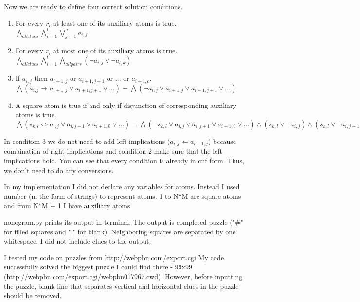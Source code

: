 \documentclass{article}
\begin{document}
Now we are ready to define four correct solution conditions.
\begin{enumerate}
    \item For every $r_i$ at least one of its auxiliary atoms is true.\\
    $\bigwedge_{all clues} \bigwedge_{i=1}^t \bigvee_{j=1}^a a_{i,j}$
    \item For every $r_i$ at most one of its auxiliary atoms is true.\\
    $\bigwedge_{all clues} \bigwedge_{i=1}^t \bigwedge_{all pairs} (\neg a_{i, j} \vee \neg a_{l, k})$
    \item If $a_{i,j}$ then $a_{i+1,j}$ or $a_{i+1,j+1}$ or ... or $a_{i+1,c}$.\\
    $\bigwedge (a_{i,j} \Rightarrow a_{i+1,j} \vee a_{i+1,j+1} \vee ...) = \bigwedge (\neg a_{i,j} \vee a_{i+1,j} \vee a_{i+1,j+1} \vee ...)$
    \item A square atom is true if and only if disjunction of corresponding auxiliary atoms is true.
    $\bigwedge (s_{k,l} \iff a_{i,j} \vee a_{i,j+1} \vee a_{i+1,0} \vee ...) = \bigwedge (\neg s_{k,l} \vee a_{i,j} \vee a_{i,j+1} \vee a_{i+1,0} \vee ...) \wedge (s_{k,l} \vee \neg a_{i,j}) \wedge (s_{k,l} \vee \neg a_{i,j+1}) \wedge ...$
\end{enumerate}

In condition 3 we do not need to add left implications ($a_{i,j} \Leftarrow a_{i+1,j}$) because combination of right implications and condition 2 make sure that the left implications hold. You can see that every condition is already in cnf form. Thus, we don't need to do any conversions.

In my implementation I did not declare any variables for atoms. Instead I used number (in the form of strings) to represent atoms. 1 to N*M are square atoms and from N*M + 1 I have auxiliary atoms.

nonogram.py prints its output in terminal. The output is completed puzzle ("\#" for filled squares and "." for blank). Neighboring squares are separated by one whitespace. I did not include clues to the output.

I tested my code on puzzles from http://webpbn.com/export.cgi My code successfully solved the biggest puzzle I could find there - 99x99\\ (http://webpbn.com/export.cgi/webpbn017967.cwd). However, before inputting the puzzle, blank line that separates vertical and horizontal clues in the puzzle should be removed.
\end{document}
